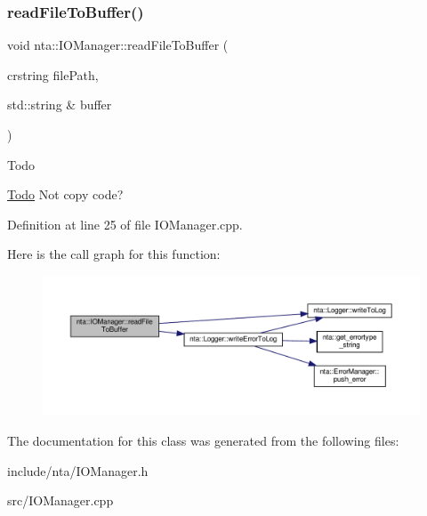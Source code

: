 \subsubsection{\texorpdfstring{read\+File\+To\+Buffer()}{readFileToBuffer()}}
{\footnotesize\ttfamily void nta\+::\+I\+O\+Manager\+::read\+File\+To\+Buffer (\begin{DoxyParamCaption}\item[{crstring}]{file\+Path,  }\item[{std\+::string \&}]{buffer }\end{DoxyParamCaption})\hspace{0.3cm}{\ttfamily [static]}}

\begin{DoxyRefDesc}{Todo}
\item[\hyperlink{todo__todo000018}{Todo}]Not copy code? \end{DoxyRefDesc}


Definition at line 25 of file I\+O\+Manager.\+cpp.

Here is the call graph for this function\+:\nopagebreak
\begin{figure}[H]
\begin{center}
\leavevmode
\includegraphics[width=350pt]{d2/d54/classnta_1_1IOManager_abbfd9da05b22aa488043a19344d38e0a_cgraph}
\end{center}
\end{figure}


The documentation for this class was generated from the following files\+:\begin{DoxyCompactItemize}
\item 
include/nta/I\+O\+Manager.\+h\item 
src/I\+O\+Manager.\+cpp\end{DoxyCompactItemize}
